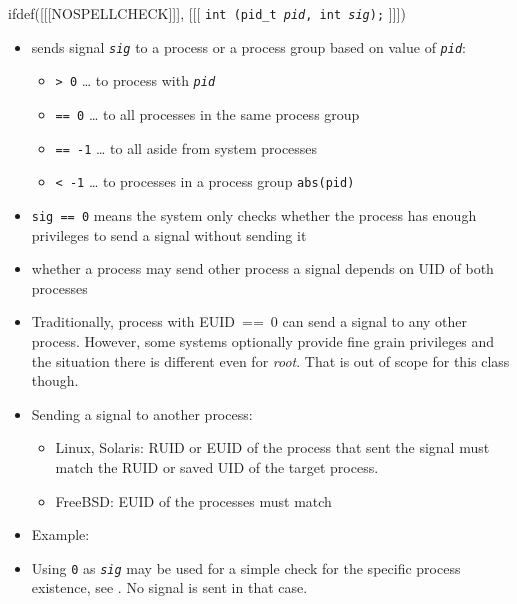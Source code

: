 \begin{slide}
ifdef([[[NOSPELLCHECK]]], [[[
\texttt{int (pid\_t \emph{pid}, int \emph{sig});}
]]])
\begin{itemize}
\item sends signal \emph{\texttt{sig}} to a process or a process group
based on value of \emph{\texttt{pid}}:
    \begin{itemize}
    \item \texttt{> 0} \dots{} to process with \emph{\texttt{pid}}
    \item \texttt{== 0} \dots{} to all processes in the same process group
    \item \texttt{== -1} \dots{} to all aside from system processes
    \item \texttt{< -1} \dots{} to processes in a process group \texttt{abs(pid)}
    \end{itemize}
\item \texttt{sig == 0} means the system only checks whether the process has
enough privileges to send a signal without sending it
\item whether a process may send other process a signal depends on UID of both
processes
\end{itemize}
\end{slide}


\begin{itemize}
\item Traditionally, process with EUID~==~0 can send a signal to any other
process.  However, some systems optionally provide fine grain privileges and the
situation there is different even for \emph{root}. That is out of scope for
this class though.
\item Sending a signal to another process:
    \begin{itemize}
    \item Linux, Solaris: RUID or EUID of the process that sent the signal must
    match the RUID or saved UID of the target process.
    \item FreeBSD: EUID of the processes must match
    \end{itemize}
\item Example: 
\item Using \texttt{0} as \emph{\texttt{sig}} may be used for a simple check for
the specific process existence, see .
No signal is sent in that case.
\end{itemize}

